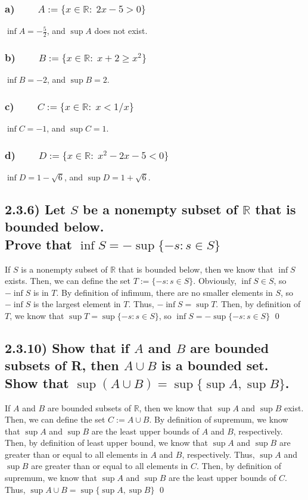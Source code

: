 \documentclass[11pt]{article}
\newcommand{\R}{\mathbb{R}}    %
\begin{document}
    \subsubsection*{a) $\qquad A := \{x \in \R : \; 2x-5 > 0\}$}
        $\inf{A}=-\frac{5}{2}$, and $\sup{A}$ does not exist.
    \subsubsection*{b) $\qquad B := \{x \in \R : \; x+2 \geq x^2\}$}
        $\inf{B}=-2$, and $\sup{B}=2$.
    \subsubsection*{c) $\qquad C := \{x \in \R : \; x < 1/x\}$}
        $\inf{C}=-1$, and $\sup{C}=1$.
    \subsubsection*{d) $\qquad D := \{x \in \R : \; x^2-2x-5 < 0\}$}
        $\inf{D}=1-\sqrt{6}$, and $\sup{D}=1+\sqrt{6}$.

\subsection*{2.3.6) Let $S$ be a nonempty subset of $\R$ that is bounded below. \\ Prove that $\inf{S}=-\sup{\{-s:s \in S\}}$}
    If $S$ is a nonempty subset of $\R$ that is bounded below, then we know that $\inf{S}$ exists. Then, we can define the set $T:=\{-s:s \in S\}$. Obviously, $\inf{S} \in S$, so $-\inf{S}$ is in $T$. By definition of infimum, there are no smaller elements in $S$, so $-\inf{S}$ is the largest element in $T$. Thus, $-\inf{S}=\sup{T}$. Then, by definition of $T$, we know that $\sup{T}=\sup{\{-s:s \in S\}}$, so $\inf{S}=-\sup{\{-s:s \in S\}}$ \qed

\subsection*{2.3.10) \quad Show that if $A$ and $B$ are bounded subsets of R, then $A\cup B$ is a bounded set. Show that $\sup(A\cup B)=\sup\{\sup A, \sup B\}$.}
    If $A$ and $B$ are bounded subsets of $\R$, then we know that $\sup{A}$ and $\sup{B}$ exist. Then, we can define the set $C:=A\cup B$. By definition of supremum, we know that $\sup{A}$ and $\sup{B}$ are the least upper bounds of $A$ and $B$, respectively. Then, by definition of least upper bound, we know that $\sup{A}$ and $\sup{B}$ are greater than or equal to all elements in $A$ and $B$, respectively. Thus, $\sup{A}$ and $\sup{B}$ are greater than or equal to all elements in $C$. Then, by definition of supremum, we know that $\sup{A}$ and $\sup{B}$ are the least upper bounds of $C$. Thus, $\sup{A\cup B}=\sup\{\sup{A}, \sup{B}\}$ \qed
\end{document}
